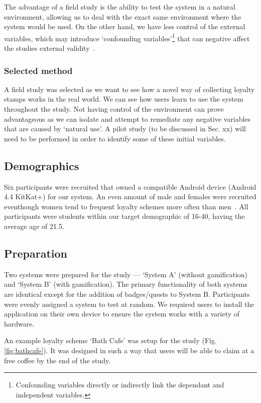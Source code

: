 The advantage of a field study is the ability to test the system in a natural environment, allowing us to deal with the exact same environment where the system would be used. On the other hand, we have less control of the external variables, which may introduce `confounding variables'\footnote{Confounding variables directly or indirectly link the dependant and independent variables.} that can negative affect the studies external validity~\cite{fieldstudysux}.

\subsubsection{Selected method}
A field study was selected as we want to see how a novel way of collecting loyalty stamps works in the real world. We can see how users learn to use the system throughout the study. Not having control of the environment can prove advantageous as we can isolate and attempt to remediate any negative variables that are caused by `natural use'. A pilot study (to be discussed in Sec. xx) will need to be performed in order to identify some of these initial variables.

\subsection{Demographics}
Six participants were recruited that owned a compatible Android device (Android 4.4 KitKat+) for our system. An even amount of male and females were recruited eventhough women tend to frequent loyalty schemes more often than men~\cite{womenloyalty}. All participants were students within our target demographic of 16-40, having the average age of 21.5.

\subsection{Preparation}
Two systems were prepared for the study --- `System A' (without gamification) and `System B' (with gamification). The primary functionality of both systems are identical except for the addition of badges/quests to System B. Participants were evenly assigned a system to test at random. We required users to install the application on their own device to ensure the system works with a variety of hardware. 

An example loyalty scheme `Bath Cafe' was setup for the study (Fig. \ref{fig:bathcafe}). It was designed in such a way that users will be able to claim at a free coffee by the end of the study.

